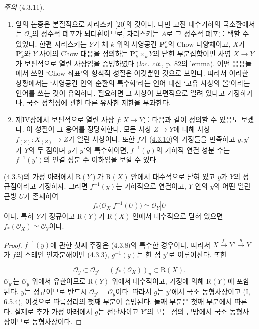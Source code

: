 \begin{env}[4.3.11]
\label{III.4.3.11-fr}
\emph{주의} (4.3.11). ---
\begin{enumerate}
\item[(i)]
앞의 논증은 본질적으로 자리스키 [20]의 것이다. 다만 고전 대수기하의
국소환에서는 $\mathcal O_y$의 정수적 폐포가 뇌터환이므로, 자리스키는
$A$로 그 정수적 폐포를 택할 수 있었다. 한편 자리스키는 $Y$가 체
$k$ 위의 사영공간 $\mathbf P_k^r$의 Chow 다양체이고, $X$가
$\mathbf P_k^r$와 $Y$ 사이의 Chow 대응을 정의하는
$\mathbf P_k^r\times_kY$의 닫힌 부분집합이면 사영
$X\to Y$가 보편적으로 열린 사상임을 증명하였다
(\emph{loc. cit.}, p. 82의 lemma). 어떤 응용들에서 쓰인
‘Chow 좌표’의 형식적 성질은 이것뿐인 것으로 보인다. 따라서 이러한
상황에서는 ‘사영공간 안의 순환의 특수화’라는 언어 대신 ‘고유 사상의
올’이라는 언어를 쓰는 것이 유익하다. 필요하면 그 사상이 보편적으로
열려 있다고 가정하거나, 국소 정칙성에 관한 다른 유사한 제한을
부과한다.

\item[(ii)]
제IV장에서 보편적으로 열린 사상 $f:X\to Y$를 다음과 같이 정의할
수 있음도 보겠다. 이 성질이 그 용어를 정당화한다. 모든 사상
$Z\to Y$에 대해 사상 $f_{(Z)}:X_{(Z)}\to Z$가 열린 사상이다. 또한
$f$가 (\hyperref[III.4.3.10-fr]{4.3.10})의 가정들을 만족하고
$y,y'$가 $Y$의 두 점이며 $y$가 $y'$의 특수화이면, $f^{-1}(y)$의
기하적 연결 성분 수는 $f^{-1}(y')$의 연결 성분 수 이하임을 보일 수
있다.
\end{enumerate}
\end{env}

\begin{corollary}[4.3.12]
\label{III.4.3.12-fr}
(\hyperref[III.4.3.5-fr]{4.3.5})의 가정 아래에서
$\mathrm R(Y)$가 $\mathrm R(X)$ 안에서 대수적으로 닫혀 있고 $y$가
$Y$의 정규점이라고 가정하자. 그러면 $f^{-1}(y)$는 기하적으로
연결이고, $Y$ 안의 $y$의 어떤 열린 근방 $U$가 존재하여
\[
f_*(\mathcal O_X|f^{-1}(U))\simeq\mathcal O_Y|U
\]
이다. 특히 $Y$가 정규이고 $\mathrm R(Y)$가 $\mathrm R(X)$ 안에서
대수적으로 닫혀 있으면
$f_*(\mathcal O_X)\simeq\mathcal O_Y$이다.
\end{corollary}

\begin{proof}
$f^{-1}(y)$에 관한 첫째 주장은
(\hyperref[III.4.3.8-fr]{4.3.8})의 특수한 경우이다. 따라서
$X\xrightarrow{f'}Y'\xrightarrow{g}Y$가 $f$의 스테인 인자분해이면
(\hyperref[III.4.3.3-fr]{4.3.3}), $g^{-1}(y)$는 한 점 $y'$로
이루어진다. 또한


\[
\mathcal O_y\subset\mathcal O_{y'}=(f_*(\mathcal O_X))_y
\subset\mathrm R(X).
\]
$\mathcal O_{y'}$는 $\mathcal O_y$ 위에서 유한이므로
$\mathrm R(Y)$ 위에서 대수적이고, 가정에 의해 $\mathrm R(Y)$에
포함된다. $y$는 정규이므로 반드시
$\mathcal O_{y'}=\mathcal O_y$이다. 따라서 $g$는 $y'$에서 국소
동형사상이고 (I, 6.5.4), 이것으로 따름정리의 첫째 부분이 증명된다.
둘째 부분은 첫째 부분에서 따른다. 실제로 추가 가정 아래에서 $g$는
전단사이고 $Y'$의 모든 점의 근방에서 국소 동형사상이므로
동형사상이다.
\end{proof}

